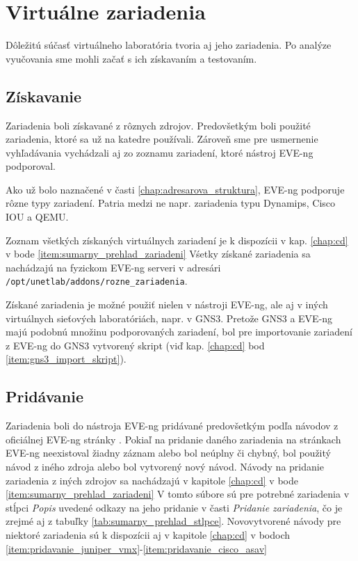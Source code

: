 \chapter{Virtuálne zariadenia}
\label{chap:virt_zariadenia}

Dôležitú súčasť virtuálneho laboratória tvoria aj jeho zariadenia. Po analýze vyučovania sme mohli začať s ich získavaním a testovaním.




\section{Získavanie}

Zariadenia boli získavané z rôznych zdrojov. Predovšetkým boli použité zariadenia, ktoré sa už na katedre používali. Zároveň sme pre usmernenie vyhľadávania vychádzali aj zo zoznamu zariadení, ktoré nástroj EVE-ng podporoval.

Ako už bolo naznačené v časti \ref{chap:adresarova_struktura}, EVE-ng podporuje rôzne typy zariadení. Patria medzi ne napr. zariadenia typu Dynamips, Cisco IOU a QEMU.

Zoznam všetkých získaných virtuálnych zariadení je k dispozícii v kap. \ref{chap:cd} v bode \ref{item:sumarny_prehlad_zariadeni} Vśetky získané zariadenia sa nachádzajú na fyzickom EVE-ng serveri v adresári \\
\texttt{/opt/unetlab/addons/rozne\_zariadenia}.

Získané zariadenia je možné použiť nielen v nástroji EVE-ng, ale aj v iných virtuálnych sieťových laboratóriách, napr. v GNS3. Pretože GNS3 a EVE-ng majú podobnú množinu podporovaných zariadení, bol pre importovanie zariadení z EVE-ng do GNS3 vytvorený skript (viď kap. \ref{chap:cd} bod \ref{item:gns3_import_skript}).





\section{Pridávanie}


Zariadenia boli do nástroja EVE-ng pridávané predovšetkým podľa návodov z oficiálnej EVE-ng stránky \cite{eve_ng_howtos}. Pokiaľ na pridanie daného zariadenia na stránkach EVE-ng neexistoval žiadny záznam alebo bol neúplny či chybný, bol použitý návod z iného zdroja alebo bol vytvorený nový návod. Návody na pridanie zariadenia z iných zdrojov sa nachádzajú v kapitole \ref{chap:cd} v bode \ref{item:sumarny_prehlad_zariadeni} V tomto súbore sú pre potrebné zariadenia v stĺpci \emph{Popis} uvedené odkazy na jeho pridanie v časti \emph{Pridanie zariadenia}, čo je zrejmé aj z tabuľky \ref{tab:sumarny_prehlad_stlpce}. Novovytvorené návody pre niektoré zariadenia sú k dispozícii aj v kapitole \ref{chap:cd} v bodoch \ref{item:pridavanie_juniper_vmx}-\ref{item:pridavanie_cisco_asav}

